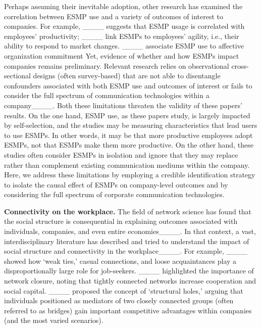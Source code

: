 Perhaps assuming their inevitable adoption, other research has examined the correlation between ESMP use and a variety of outcomes of interest to companies.
For example, ____ suggests that ESMP usage is correlated with employees' productivity;
____ link ESMPs to employees' agility, i.e., their ability to respond to market changes.
____ associate ESMP use to affective organization commitment
Yet, evidence of whether and how ESMPs impact companies remains preliminary. 
Relevant research relies on observational cross-sectional designs (often survey-based) that are not able to disentangle confounders associated with both ESMP use and outcomes of interest or fails to consider the full spectrum of communication technologies within a company____.
Both these limitations threaten the validity of these papers' results. 
On the one hand, ESMP use, as these papers study, is largely impacted by self-selection, and the studies may be measuring characteristics that lead users to use ESMPs.
In other words, it may be that more productive employees adopt ESMPs, not that ESMPs make them more productive.
On the other hand, these studies often consider ESMPs in isolation and ignore that they may replace rather than complement existing communication mediums within the company.
Here, we address these limitations by employing a credible identification strategy to isolate the causal effect of ESMPs on company-level outcomes and by considering the full spectrum of corporate communication technologies. 

\vspace{0.5mm}
\noindent
\textbf{Connectivity on the workplace.}
The field of network science has found that the social structure is consequential in explaining outcomes associated with individuals, companies, and even entire economies____. 
In that context, a vast, interdisciplinary literature has described and tried to understand the impact of social structure and connectivity in the workplace____.
For example, ____ showed how `weak ties,' casual connections, and loose acquaintances play a disproportionally large role for job-seekers.
____ highlighted the importance of network closure, noting that tightly connected networks increase cooperation and social capital.
____ proposed the concept of `structural holes,' arguing that individuals positioned as mediators of two closely connected groups  (often referred to as bridges) gain important competitive advantages within companies (and the most varied scenarios).

